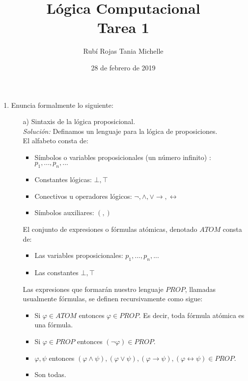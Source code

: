\documentclass[letterpaper,10pt]{article}
\title{Lógica Computacional \\ Tarea 1}
\author{Rubí Rojas Tania Michelle}
\date{28 de febrero de 2019}
\begin{document}
    \maketitle

    \begin{enumerate}
        
        \item Enuncia formalmente lo siguiente:
        \begin{itemize}

            \item[a)] Sintaxis de la lógica proposicional. \\
            \textit{Solución:} Definamos un lenguaje para la lógica de
            proposiciones.  \\
            El alfabeto consta de:

            \begin{itemize}
                \item Símbolos o variables proposicionales (un número
                infinito) : $p_{1}, ... , p_{n}, ...$
                \item Constantes lógicas: $\bot, \top$
                \item Conectivos u operadores lógicos: $\neg, \land, \lor 
                \rightarrow, \leftrightarrow$
                \item Símbolos auxiliares: $(,)$
            \end{itemize}

            El conjunto de expresiones o fórmulas atómicas, denotado
            $ATOM$ consta de:

            \begin{itemize}
                \item Las variables proposicionales: $p_{1}, ..., p_{n}, ...$
                \item Las constantes $\bot, \top$
            \end{itemize}

            Las expresiones que formarán nuestro lenguaje $PROP$, llamadas
            usualmente fórmulas, se definen recursivamente como sigue:

            \begin{itemize}
                \item Si $\varphi \in ATOM$ entonces $\varphi \in PROP$. Es 
                decir, toda fórmula atómica es una fórmula.
                \item Si $\varphi \in PROP$ entonces 
                $(\neg \varphi) \in PROP$.
                \item $\varphi, \psi$ entonces $(\varphi \land \psi), 
                (\varphi \lor \psi), (\varphi \rightarrow \psi), 
                (\varphi \leftrightarrow \psi) \in PROP$.
                \item Son todas.
            \end{itemize}


\end{itemize}
\end{enumerate}
\end{document}
